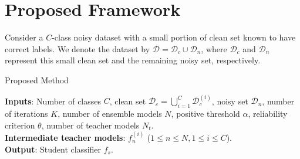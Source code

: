 \documentclass[conference]{IEEEtran}
\begin{document}
\section{Proposed Framework}
\label{sec: proposed method}

Consider a $C$-class noisy dataset with a small portion of clean set known to have correct labels. We denote the dataset by $\mathcal{D}=\mathcal{D}_c \cup \mathcal{D}_n$, where $\mathcal{D}_c$ and $\mathcal{D}_n$ represent this small clean set and the remaining noisy set, respectively.

\begin{algorithm}[H]
\caption{Proposed Method}\label{alg:algorithm}
\textbf{Inputs}: Number of classes $C$, clean set $\textstyle\mathcal{D}_c=\bigcup_{i= 1}^C\mathcal{D}_c^{(i)}$, noisy set $\mathcal{D}_n$, number of iterations $K$, number of ensemble models $N$, positive threshold $\alpha$, reliability criterion $\theta$, number of teacher models $N_t$. \\
\textbf{Intermediate teacher models}: $f^{(i)}_n$ ($1\leq n\leq N, 1\leq i\leq C$).\\
\textbf{Output}: Student classifier $f_s$.\\[-0.9em]
\begin{algorithmic}[1] 
    \ENDFOR

\end{algorithmic}
\end{algorithm}
\end{document}
